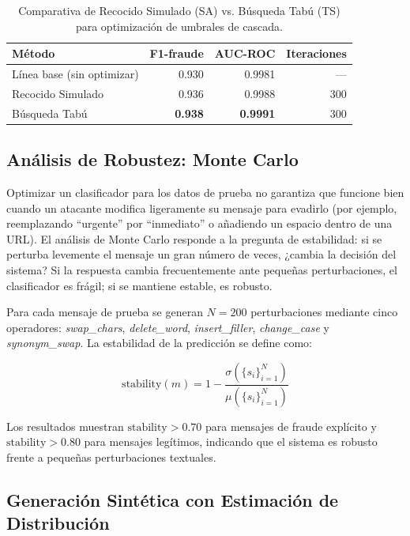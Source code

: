 \documentclass{llncs}
\begin{document}
\begin{table}[t]
\caption{Comparativa de Recocido Simulado (SA) vs. Búsqueda Tabú (TS)
para optimización de umbrales de cascada.}
\label{tab:metaheuristics}
\centering
\begin{tabular}{lrrr}
\toprule
Método & F1-fraude & AUC-ROC & Iteraciones \\
\midrule
Línea base (sin optimizar) & 0.930 & 0.9981 & --- \\
Recocido Simulado          & 0.936 & 0.9988 & 300 \\
Búsqueda Tabú              & \textbf{0.938} & \textbf{0.9991} & 300 \\
\bottomrule
\end{tabular}
\end{table}

\subsection{Análisis de Robustez: Monte Carlo}
\label{sec:meta:mc}

Optimizar un clasificador para los datos de prueba no garantiza
que funcione bien cuando un atacante modifica ligeramente su mensaje
para evadirlo (por ejemplo, reemplazando ``urgente'' por ``inmediato''
o añadiendo un espacio dentro de una URL).
El análisis de Monte Carlo responde a la pregunta de estabilidad:
si se perturba levemente el mensaje un gran número de veces,
¿cambia la decisión del sistema?
Si la respuesta cambia frecuentemente ante pequeñas perturbaciones,
el clasificador es frágil; si se mantiene estable, es robusto.

Para cada mensaje de prueba se generan $N=200$ perturbaciones
mediante cinco operadores: \textit{swap\_chars},
\textit{delete\_word}, \textit{insert\_filler},
\textit{change\_case} y \textit{synonym\_swap}.
La estabilidad de la predicción se define como:

\begin{equation}
  \mathrm{stability}(m) = 1 - \frac{\sigma(\{s_i\}_{i=1}^N)}
                                    {\mu(\{s_i\}_{i=1}^N)}
  \label{eq:stability}
\end{equation}

Los resultados muestran $\mathrm{stability} > 0.70$ para mensajes
de fraude explícito y $\mathrm{stability} > 0.80$ para mensajes
legítimos, indicando que el sistema es robusto frente a pequeñas
perturbaciones textuales.

\subsection{Generación Sintética con Estimación de Distribución}
\label{sec:meta:eda}
\end{document}

